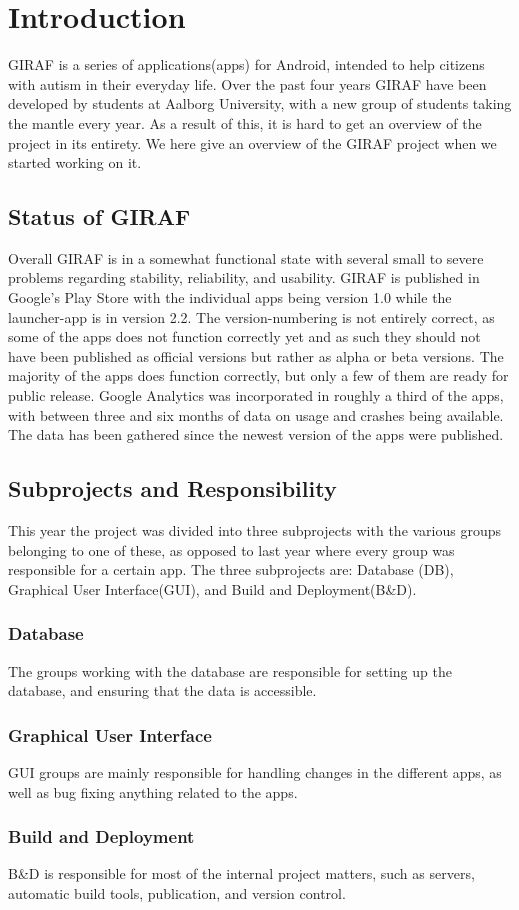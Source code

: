 \chapter{Introduction} \label{ChapIntroduction}
GIRAF is a series of applications(apps) for Android, intended to help citizens with autism in their everyday life. Over the past four years GIRAF have been developed by students at Aalborg University, with a new group of students taking the mantle every year. As a result of this, it is hard to get an overview of the project in its entirety. We here give an overview of the GIRAF project when we started working on it.

\section{Status of GIRAF}
Overall GIRAF is in a somewhat functional state with several small to severe problems regarding stability, reliability, and usability.
GIRAF is published in Google's Play Store with the individual apps being version 1.0 while the launcher-app is in version 2.2. The version-numbering is not entirely correct, as some of the apps does not function correctly yet and as such they should not have been published as official versions but rather as alpha or beta versions. The majority of the apps does function correctly, but only a few of them are ready for public release.
Google Analytics was incorporated in roughly a third of the apps, with between three and six months of data on usage and crashes being available. The data has been gathered since the newest version of the apps were published.

\section{Subprojects and Responsibility}
This year the project was divided into three subprojects with the various groups belonging to one of these, as opposed to last year where every group was responsible for a certain app. The three subprojects are: Database (DB), Graphical User Interface(GUI), and Build and Deployment(B\&D).

\subsection{Database}
The groups working with the database are responsible for setting up the database, and ensuring that the data is accessible.

\subsection{Graphical User Interface}
GUI groups are mainly responsible for handling changes in the different apps, as well as bug fixing anything related to the apps.

\subsection{Build and Deployment}
B\&D is responsible for most of the internal project matters, such as servers, automatic build tools, publication, and version control.